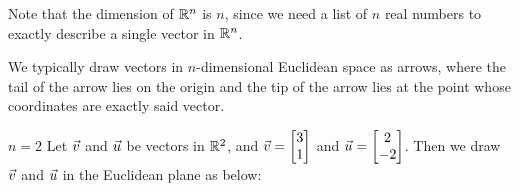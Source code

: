 Note that the dimension of $\mathbb{R}^n$ is $n$, since we need a list of $n$ real numbers to exactly describe a single vector in $\mathbb{R}^n$.

We typically draw vectors in $n$-dimensional Euclidean space as arrows, where the tail of the arrow lies on the origin and the tip of the arrow lies at the point whose coordinates are exactly said vector.

\begin{example}{$n=2$}
Let $\vec{v}$ and $\vec{u}$ be vectors in $\mathbb{R}^2$, and $\vec{v}=\begin{bmatrix}3\\1\end{bmatrix}$ and $\vec{u}=\begin{bmatrix}2\\-2\end{bmatrix}$. Then we draw $\vec{v}$ and $\vec{u}$ in the Euclidean plane as below:

\begin{center}
\end{center}
\end{example}